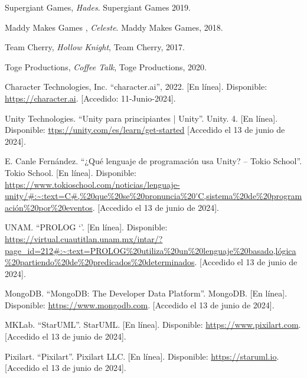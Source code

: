 \documentclass[12pt,twoside]{article}
\begin{document}
	\begin{thebibliography}{10}
	
	Supergiant Games, \textit{Hades}. Supergiant Games 2019.
	
	Maddy Makes Games , \textit{Celeste}. Maddy Makes Games, 2018.
	
	Team Cherry, \textit{Hollow Knight}, Team Cherry, 2017.
	
	Toge Productions, \textit{Coffee Talk}, Toge Productions, 2020.
	
	Character Technologies, Inc. ``character.ai'', 2022. [En línea]. Disponible: \url{https://character.ai}.  [Accedido: 11-Junio-2024].

	Unity Technologies. ``Unity para principiantes | Unity''. Unity. 4. [En línea]. Disponible: \url{ttps://unity.com/es/learn/get-started} [Accedido el 13 de junio de 2024].

	E. Canle Fernández. ``¿Qué lenguaje de programación usa Unity? – Tokio School”. Tokio School. [En línea]. Disponible: \url{https://www.tokioschool.com/noticias/lenguaje-unity/#:~:text=C#,%20que%20se%20pronuncia%20'C,sistema%20de%20programación%20por%20eventos}. [Accedido el 13 de junio de 2024].

	UNAM. ``PROLOG `'. [En línea]. Disponible: \url{https://virtual.cuautitlan.unam.mx/intar/?page_id=212#:~:text=PROLOG%20utiliza%20un%20lenguaje%20basado,lógica%20partiendo%20de%20predicados%20determinados}. [Accedido el 13 de junio de 2024].

	MongoDB. ``MongoDB: The Developer Data Platform''. MongoDB.  [En línea]. Disponible: \url{https://www.mongodb.com}. [Accedido el 13 de junio de 2024].

	MKLab.  ``StarUML''. StarUML. [En línea]. Disponible: \url{https://www.pixilart.com}. [Accedido el 13 de junio de 2024].
	
	Pixilart.  ``Pixilart''. Pixilart LLC. [En línea]. Disponible: \url{https://staruml.io}. [Accedido el 13 de junio de 2024].

	\end{thebibliography}
	
\end{document}
